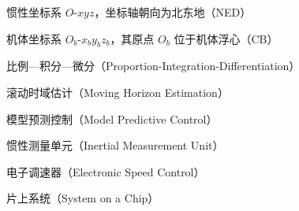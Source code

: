 \begin{denotation}
     \item[\textbf{\large 符号约定}] \mbox{}
     \vspace{0.5em}
     \item[$\mathcal{I}$] 惯性坐标系 $O\text{-}xyz$，坐标轴朝向为北东地（NED）
     \item[$\mathcal{B}$] 机体坐标系 $O_b\text{-}x_by_bz_b$，其原点 $O_b$ 位于机体浮心（CB）
     \item[] 
     \item[\textbf{\large 缩略语说明}] \mbox{}
     \vspace{0.5em}
     \item[PID] 比例—积分—微分（Proportion-Integration-Differentiation）
     \item[MHE] 滚动时域估计（Moving Horizon Estimation）
     \item[MPC] 模型预测控制（Model Predictive Control） 
     \item[IMU] 惯性测量单元（Inertial Measurement Unit）
     \item[ESC] 电子调速器（Electronic Speed Control）
     \item[SoC] 片上系统（System on a Chip）
\end{denotation}

